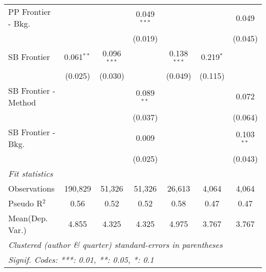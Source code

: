 \begin{tabular}{lcccccc}
   PP Frontier - Bkg.   &               &               & 0.049$^{***}$ &               &             & 0.049\\   
                        &               &               & (0.019)       &               &             & (0.045)\\   
   SB Frontier          & 0.061$^{**}$  & 0.096$^{***}$ &               & 0.138$^{***}$ & 0.219$^{*}$ &   \\   
                        & (0.025)       & (0.030)       &               & (0.049)       & (0.115)     &   \\   
   SB Frontier - Method &               &               & 0.089$^{**}$  &               &             & 0.072\\   
                        &               &               & (0.037)       &               &             & (0.064)\\   
   SB Frontier - Bkg.   &               &               & 0.009         &               &             & 0.103$^{**}$\\   
                        &               &               & (0.025)       &               &             & (0.043)\\   
   \midrule
   \emph{Fit statistics}\\
   Observations         & 190,829       & 51,326        & 51,326        & 26,613        & 4,064       & 4,064\\  
   Pseudo R$^2$         & 0.56          & 0.52          & 0.52          & 0.58          & 0.47        & 0.47\\  
Mean(Dep. Var.) & 4.855 & 4.325 & 4.325 & 4.975 & 3.767 & 3.767 \\
   \midrule \midrule
   \multicolumn{7}{l}{\emph{Clustered (author \& quarter) standard-errors in parentheses}}\\
   \multicolumn{7}{l}{\emph{Signif. Codes: ***: 0.01, **: 0.05, *: 0.1}}\\
\end{tabular}
\par\endgroup
